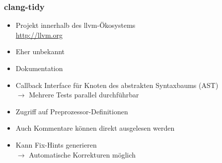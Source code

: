 \documentclass[aspectratio=169]{beamer}
\begin{document}
\begin{frame}
  \frametitle{clang-tidy}
  \begin{itemize}
  \item Projekt innerhalb des llvm-Ökosystems\\
    \qquad \url{http://llvm.org}
    \pause
  \item Eher unbekannt
    \pause
  \item Dokumentation 
    \pause
  \item Callback Interface für Knoten des abstrakten Syntaxbaums (AST)
    \pause \\
    \qquad $\rightarrow$ Mehrere Tests parallel durchführbar
    \pause
  \item Zugriff auf Preprozessor-Definitionen
    \pause
  \item Auch Kommentare können direkt ausgelesen werden
    \pause
  \item Kann Fix-Hints generieren 
    \pause \\
  \qquad $\rightarrow$ Automatische Korrekturen möglich    
  \end{itemize}
\end{frame}
\end{document}
